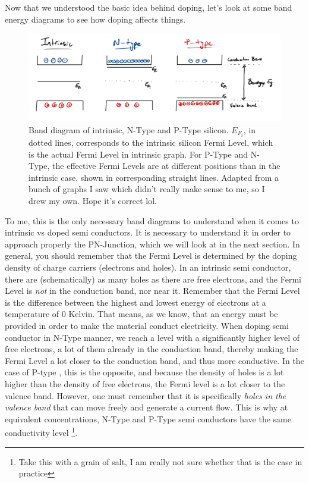 Now that we understood the basic idea behind doping, let's look at some band energy diagrams to see how doping affects things. 

\begin{figure}[H]
    \centering
    \includegraphics[width=0.95\linewidth]{../../Figures/Band diagram doping.PNG}
    \caption{Band diagram of intrinsic, N-Type and P-Type silicon. $E_{F_i}$, in dotted lines, corresponds to the intrinsic silicon Fermi Level, which is the actual Fermi Level in intrinsic graph. For P-Type and N-Type, the effective Fermi Levels are at different positions than in the intrinsic case, shown in corresponding straight lines. Adapted from a bunch of graphs I saw which didn't really make sense to me, so I drew my own. Hope it's correct lol.}
    \label{fig:Band_Diagram_Doping}
\end{figure}

To me, this is the only necessary band diagrams to understand when it comes to intrinsic vs doped semi conductors. It is necessary to understand it in order to approach properly the PN-Junction, which we will look at in the next section. In general, you should remember that the Fermi Level is determined by the doping density of charge carriers (electrons and holes). In an intrinsic semi conductor, there are (schematically) as many holes as there are free electrons, and the Fermi Level is \textit{not} in the conduction band, nor near it. Remember that the Fermi Level is the difference between the highest and lowest energy of electrons at a temperature of 0 Kelvin. That means, as we know, that an energy must be provided in order to make the material conduct electricity. When doping semi conductor in N-Type manner, we reach a level with a significantly higher level of free electrons, a lot of them already in the conduction band, thereby making the Fermi Level a lot closer to the conduction band, and thus more conductive. In the case of P-type , this is the opposite, and because the density of holes is a lot higher than the density of free electrons, the Fermi level is a lot closer to the valence band. However, one must remember that it is specifically \textit{holes in the valence band} that can move freely and generate a current flow. This is why at equivalent concentrations, N-Type and P-Type semi conductors have the same conductivity level \footnote{Take this with a grain of salt, I am really not sure whether that is the case in practice}.

